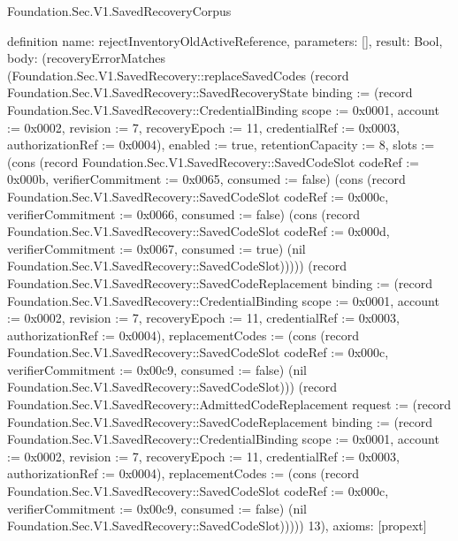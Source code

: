 \begin{lexlean}{Foundation.Sec.V1.SavedRecoveryCorpus}
\begin{semanticmodule}
definition{
  name: rejectInventoryOldActiveReference,
  parameters: [],
  result: Bool,
  body: (recoveryErrorMatches (Foundation.Sec.V1.SavedRecovery::replaceSavedCodes (record Foundation.Sec.V1.SavedRecovery::SavedRecoveryState {binding := (record Foundation.Sec.V1.SavedRecovery::CredentialBinding {scope := 0x0001, account := 0x0002, revision := 7, recoveryEpoch := 11, credentialRef := 0x0003, authorizationRef := 0x0004}), enabled := true, retentionCapacity := 8, slots := (cons (record Foundation.Sec.V1.SavedRecovery::SavedCodeSlot {codeRef := 0x000b, verifierCommitment := 0x0065, consumed := false}) (cons (record Foundation.Sec.V1.SavedRecovery::SavedCodeSlot {codeRef := 0x000c, verifierCommitment := 0x0066, consumed := false}) (cons (record Foundation.Sec.V1.SavedRecovery::SavedCodeSlot {codeRef := 0x000d, verifierCommitment := 0x0067, consumed := true}) (nil Foundation.Sec.V1.SavedRecovery::SavedCodeSlot))))}) (record Foundation.Sec.V1.SavedRecovery::SavedCodeReplacement {binding := (record Foundation.Sec.V1.SavedRecovery::CredentialBinding {scope := 0x0001, account := 0x0002, revision := 7, recoveryEpoch := 11, credentialRef := 0x0003, authorizationRef := 0x0004}), replacementCodes := (cons (record Foundation.Sec.V1.SavedRecovery::SavedCodeSlot {codeRef := 0x000c, verifierCommitment := 0x00c9, consumed := false}) (nil Foundation.Sec.V1.SavedRecovery::SavedCodeSlot))}) (record Foundation.Sec.V1.SavedRecovery::AdmittedCodeReplacement {request := (record Foundation.Sec.V1.SavedRecovery::SavedCodeReplacement {binding := (record Foundation.Sec.V1.SavedRecovery::CredentialBinding {scope := 0x0001, account := 0x0002, revision := 7, recoveryEpoch := 11, credentialRef := 0x0003, authorizationRef := 0x0004}), replacementCodes := (cons (record Foundation.Sec.V1.SavedRecovery::SavedCodeSlot {codeRef := 0x000c, verifierCommitment := 0x00c9, consumed := false}) (nil Foundation.Sec.V1.SavedRecovery::SavedCodeSlot))})})) 13),
  axioms: [propext]
}


\end{semanticmodule}
\end{lexlean}
